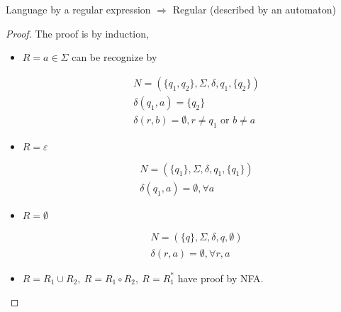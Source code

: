 \begin{lemma}
    Language by a regular expression $\Longrightarrow$ Regular (described by an automaton)
\end{lemma}
\begin{proof}
    The proof is by induction,
    \begin{itemize}
        \item $R = a \in \Sigma$ can be recognize by
        \begin{center}
        \end{center}
        \begin{align*}
            & N = (\{q_1,q_2\}, \Sigma, \delta, q_1, \{q_2\}) \\
            & \delta(q_1,a)= \{q_2\} \\
            & \delta(r,b)=\emptyset, r \neq q_1\mbox{ or } b \neq a
        \end{align*}

        \item $R = \varepsilon$
        \begin{center}
        \end{center}
        \begin{align*}
            & N=(\{q_1\},\Sigma,\delta, q_1, \{q_1\}) \\
            & \delta(q_1,a)=\emptyset, \forall a
        \end{align*}

        \item $R = \emptyset$
        \begin{center}
        \end{center}
        \begin{align*}
            &N=(\{q\}, \Sigma, \delta, q, \emptyset)\\
            &\delta(r,a)=\emptyset, \forall r, a
        \end{align*}

        \item $R=R_1\cup R_2, \ R=R_1 \circ R_2, \ R=R_1^*$ have proof by NFA.
    \end{itemize}
\end{proof}

